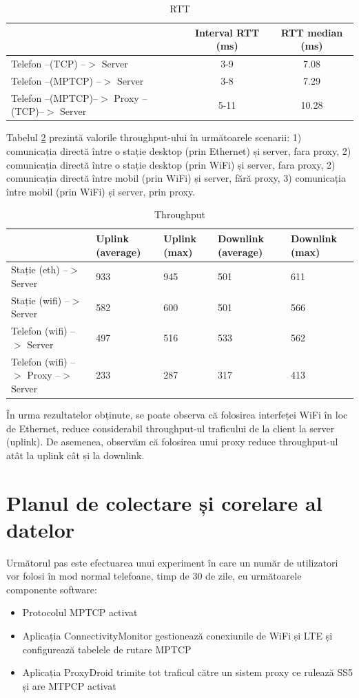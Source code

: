 \begin{table}[h]
\centering
\caption{RTT}
\label{tab:rtt}
\begin{tabular}{l | c c}
\hline
& Interval RTT (ms)  & RTT median (ms) \\
\hline
Telefon --(TCP) --$>$ Server  & 3-9 &  7.08  \\
Telefon --(MPTCP) --$>$ Server  & 3-8  & 7.29 \\
Telefon --(MPTCP)--$>$ Proxy --(TCP)--$>$ Server & 5-11  & 10.28 \\
\hline
\end{tabular}
\end{table}

Tabelul \ref{tab:throughput} prezintă valorile throughput-ului în următoarele scenarii: 1) comunicația directă între o stație desktop (prin Ethernet) și server, fara proxy, 2) comunicația directă între o stație desktop (prin WiFi) și server, fara proxy, 2) comunicația directă între mobil (prin WiFi) și server, fără proxy, 3) comunicația între mobil (prin WiFi) și server, prin proxy.

\begin{table}[h]
\centering
\caption{Throughput}
\label{tab:throughput}
\begin{tabular}{l | p{1.5cm} p{1.5cm} p{1.5cm} p{1.5cm}}
\hline
& Uplink (average) & Uplink (max) & Downlink (average) & Downlink (max) \\
\hline
Stație (eth) --$>$ Server & 933 & 945 & 501 & 611 \\
Stație (wifi) --$>$ Server & 582  & 600  & 501  & 566  \\
Telefon (wifi) --$>$ Server & 497 & 516 & 533 & 562 \\
Telefon (wifi) --$>$ Proxy --$>$ Server & 233 & 287 & 317 & 413 \\
\hline
\end{tabular}
\end{table}

În urma rezultatelor obținute, se poate observa că folosirea interfeței WiFi în loc de Ethernet, reduce considerabil throughput-ul traficului de la client la server (uplink). De asemenea, observăm că  folosirea unui proxy reduce throughput-ul atât la uplink cât și la downlink.

\section{Planul de colectare și corelare al datelor}

Următorul pas este efectuarea unui experiment în care un număr de utilizatori vor folosi în mod normal telefoane, timp de 30 de zile, cu următoarele componente software:
\begin{itemize}
	\item Protocolul MPTCP activat
	\item Aplicația ConnectivityMonitor gestionează conexiunile de WiFi și LTE și configurează tabelele de rutare MPTCP
	\item Aplicația ProxyDroid trimite tot traficul către un sistem proxy ce rulează SS5 și are MTPCP activat 
\end{itemize}


